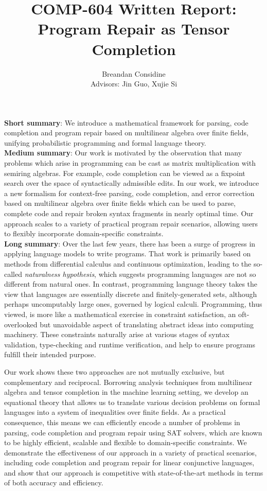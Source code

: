 \documentclass[11pt]{article}
\title{COMP-604 Written Report:\\\huge{Program Repair as Tensor Completion}}
\author{Breandan Considine\\\small{Advisors: Jin Guo, Xujie Si}}
\begin{document}
\maketitle

\noindent\textbf{Short summary}: We introduce a mathematical framework for parsing, code completion and program repair based on multilinear algebra over finite fields, unifying probabilistic programming and formal language theory.\\

\noindent\textbf{Medium summary}: Our work is motivated by the observation that many problems which arise in programming can be cast as matrix multiplication with semiring algebras. For example, code completion can be viewed as a fixpoint search over the space of syntactically admissible edits. In our work, we introduce a new formalism for context-free parsing, code completion, and error correction based on multilinear algebra over finite fields which can be used to parse, complete code and repair broken syntax fragments in nearly optimal time. Our approach scales to a variety of practical program repair scenarios, allowing users to flexibly incorporate domain-specific constraints.\\

\noindent\textbf{Long summary}: Over the last few years, there has been a surge of progress in applying language models to write programs. That work is primarily based on methods from differential calculus and continuous optimization, leading to the so-called \textit{naturalness hypothesis}, which suggests programming languages are not so different from natural ones. In contrast, programming language theory takes the view that languages are essentially discrete and finitely-generated sets, although perhaps uncomputably large ones, governed by logical calculi. Programming, thus viewed, is more like a mathematical exercise in constraint satisfaction, an oft-overlooked but unavoidable aspect of translating abstract ideas into computing machinery. These constraints naturally arise at various stages of syntax validation, type-checking and runtime verification, and help to ensure programs fulfill their intended purpose.

Our work shows these two approaches are not mutually exclusive, but complementary and reciprocal. Borrowing analysis techniques from multilinear algebra and tensor completion in the machine learning setting, we develop an equational theory that allows us to translate various decision problems on formal languages into a system of inequalities over finite fields. As a practical consequence, this means we can efficiently encode a number of problems in parsing, code completion and program repair using SAT solvers, which are known to be highly efficient, scalable and flexible to domain-specific constraints. We demonstrate the effectiveness of our approach in a variety of practical scenarios, including code completion and program repair for linear conjunctive languages, and show that our approach is competitive with state-of-the-art methods in terms of both accuracy and efficiency.
\end{document}
